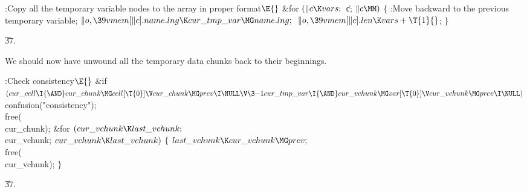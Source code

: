 \B{}:Copy all the temporary variable nodes to the  array in proper format\X${}\E{}$\6
\&{for} ${}(\|c\K\\{vars};{}$ \|c; ${}\|c\MM){}$\5
${}\{{}$\1\6
:Move  backward to the previous temporary variable\X;%
\6
${}\|o,\39\\{vmem}[\|c].\\{name}.\\{lng}\K\\{cur\_tmp\_var}\MG\\{name}.%
\\{lng};{}$\6
${}\|o,\39\\{vmem}[\|c].\\{len}\K\\{vars}+\T{1}{}$;\6
\4${}\}{}$\2\par
\U37.\fi

We should now have unwound all the temporary data chunks
back to their
beginnings.

\Y\B\4:Check consistency\X${}\E{}$\6
\&{if} ${}(\\{cur\_cell}\I{\AND}\\{cur\_chunk}\MG\\{cell}[\T{0}]\V\\{cur%
\_chunk}\MG\\{prev}\I\NULL\V\3{-1}\\{cur\_tmp\_var}\I{\AND}\\{cur\_vchunk}\MG%
\\{var}[\T{0}]\V\\{cur\_vchunk}\MG\\{prev}\I\NULL){}$\1\5
\\{confusion}(\.{"consistency"});\2\6
\\{free}(\\{cur\_chunk});\6
\&{for} ${}(\\{cur\_vchunk}\K\\{last\_vchunk};{}$ \\{cur\_vchunk}; ${}\\{cur%
\_vchunk}\K\\{last\_vchunk}){}$\5
${}\{{}$\1\6
${}\\{last\_vchunk}\K\\{cur\_vchunk}\MG\\{prev};{}$\6
\\{free}(\\{cur\_vchunk});\6
\4${}\}{}$\2\par
\U37.\fi

